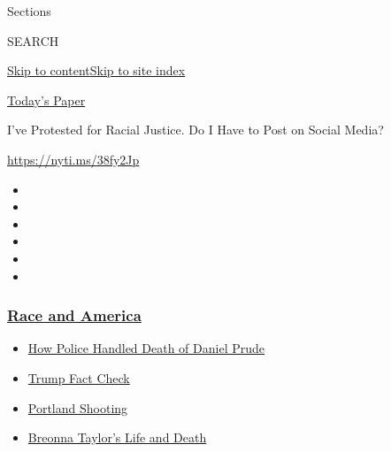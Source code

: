Sections

SEARCH

\protect\hyperlink{site-content}{Skip to
content}\protect\hyperlink{site-index}{Skip to site index}

\href{https://myaccount.nytimes3xbfgragh.onion/auth/login?response_type=cookie\&client_id=vi}{}

\href{https://www.nytimes3xbfgragh.onion/section/todayspaper}{Today's
Paper}

I've Protested for Racial Justice. Do I Have to Post on Social Media?

\url{https://nyti.ms/38fy2Jp}

\begin{itemize}
\item
\item
\item
\item
\item
\item
\end{itemize}

\hypertarget{race-and-america}{%
\subsubsection{\texorpdfstring{\href{https://www.nytimes3xbfgragh.onion/news-event/george-floyd-protests-minneapolis-new-york-los-angeles?name=styln-george-floyd\&region=TOP_BANNER\&block=storyline_menu_recirc\&action=click\&pgtype=Article\&impression_id=e578cfa0-f1c6-11ea-a94a-39b63fbebb75\&variant=undefined}{Race
and America}}{Race and America}}\label{race-and-america}}

\begin{itemize}
\tightlist
\item
  \href{https://www.nytimes3xbfgragh.onion/2020/09/04/nyregion/rochester-police-daniel-prude.html?name=styln-george-floyd\&region=TOP_BANNER\&block=storyline_menu_recirc\&action=click\&pgtype=Article\&impression_id=e578cfa1-f1c6-11ea-a94a-39b63fbebb75\&variant=undefined}{How
  Police Handled Death of Daniel Prude}
\item
  \href{https://www.nytimes3xbfgragh.onion/2020/09/01/us/politics/trump-fact-check-protests.html?name=styln-george-floyd\&region=TOP_BANNER\&block=storyline_menu_recirc\&action=click\&pgtype=Article\&impression_id=e578cfa2-f1c6-11ea-a94a-39b63fbebb75\&variant=undefined}{Trump
  Fact Check}
\item
  \href{https://www.nytimes3xbfgragh.onion/2020/08/30/us/portland-shooting-explained.html?name=styln-george-floyd\&region=TOP_BANNER\&block=storyline_menu_recirc\&action=click\&pgtype=Article\&impression_id=e578f6b0-f1c6-11ea-a94a-39b63fbebb75\&variant=undefined}{Portland
  Shooting}
\item
  \href{https://www.nytimes3xbfgragh.onion/2020/08/30/us/breonna-taylor-police-killing.html?name=styln-george-floyd\&region=TOP_BANNER\&block=storyline_menu_recirc\&action=click\&pgtype=Article\&impression_id=e578f6b1-f1c6-11ea-a94a-39b63fbebb75\&variant=undefined}{Breonna
  Taylor's Life and Death}
\end{itemize}

